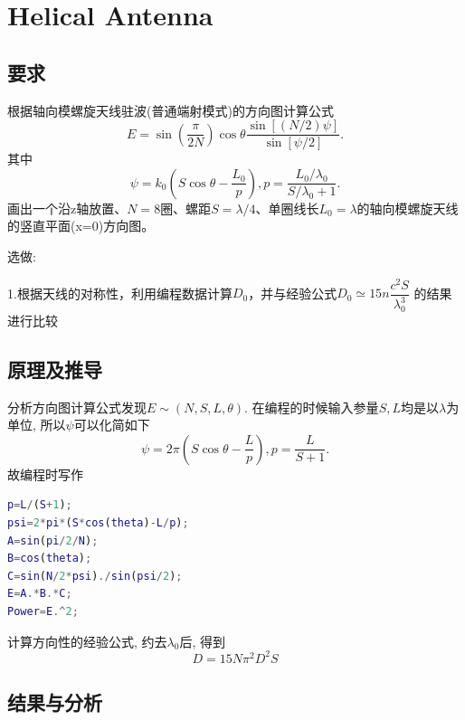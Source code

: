 
\section{Helical Antenna}
\subsection{要求}
\noindent 
根据轴向模螺旋天线驻波(普通端射模式)的方向图计算公式
\begin{equation}
E=\sin\left(\frac{\pi}{2N}\right)\cos\theta\dfrac{\sin\left[\left(N/2\right)\psi\right]}{\sin\left[\psi/2\right]}.
\end{equation}
其中
\begin{equation}
\psi=k_0\left(S\cos\theta-\frac{L_0}{p}\right), p=\frac{L_0/\lambda_0}{S/\lambda_0 +1}.
\end{equation}
画出一个沿z轴放置、$N=8$圈、螺距$S=\lambda/4$、单圈线长$L_0=\lambda$的轴向模螺旋天线的竖直平面(x=0)方向图。

\noindent 选做:

1.根据天线的对称性，利用编程数据计算$D_0$，并与经验公式$D_0\simeq15n\dfrac{c^2S}{\lambda_0^3}$
的结果进行比较


\subsection{原理及推导}
分析方向图计算公式发现$E\sim\left(N,S,L,\theta\right)$. 在编程的时候输入参量$S,L$均是以$\lambda$为单位, 所以$\psi$可以化简如下
\begin{equation}
\psi=2\pi\left(S\cos\theta-\frac{L}{p}\right), p=\frac{L}{S+1}.
\end{equation}
故编程时写作
\begin{lstlisting}[language={matlab},keywordstyle=\color{blue!70},commentstyle=\color{red!50!green!50!blue!50},frame=shadowbox, rulesepcolor=\color{red!20!green!20!blue!20}] 
p=L/(S+1);
psi=2*pi*(S*cos(theta)-L/p);
A=sin(pi/2/N);
B=cos(theta);
C=sin(N/2*psi)./sin(psi/2);
E=A.*B.*C;
Power=E.^2;
\end{lstlisting}

计算方向性的经验公式, 约去$\lambda_0$后, 得到
\begin{equation}
D=15N\pi^2 D^2 S
\end{equation}
\subsection{结果与分析}
